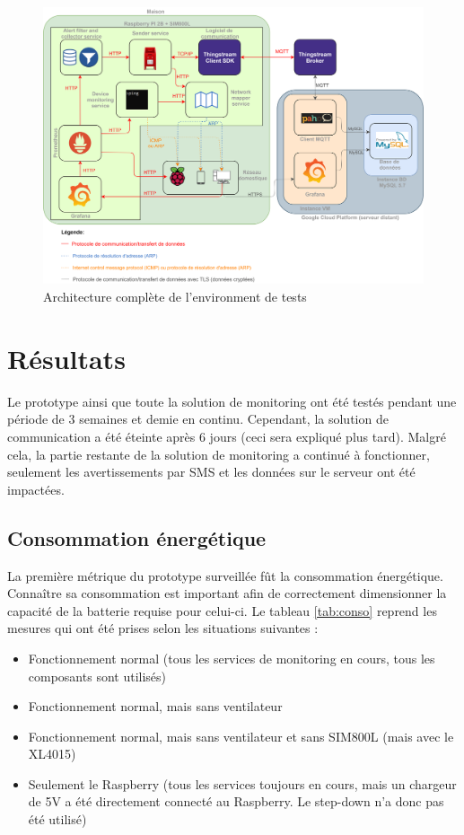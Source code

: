 \begin{figure} [ht!]
  \includegraphics[width=\textwidth]{img/tests/test_env.png}
  \caption{Architecture complète de l'environment de tests}
  \label{fig:test_deploy}
\end{figure}


\section{Résultats}

\noindent
Le prototype ainsi que toute la solution de monitoring ont été testés pendant une période de 3 semaines et demie en continu. Cependant, la solution de communication a été éteinte après 6 jours (ceci sera expliqué plus tard). Malgré cela, la partie restante de la solution de monitoring a continué à fonctionner, seulement les avertissements par SMS et les données sur le serveur ont été impactées.

\subsection{Consommation énergétique}

\noindent
La première métrique du prototype surveillée fût la consommation énergétique. Connaître sa consommation est important afin de correctement dimensionner la capacité de la batterie requise pour celui-ci. Le tableau \ref{tab:conso} reprend les mesures qui ont été prises selon les situations suivantes :
\vspace{0.1cm}
\begin{itemize}
  \item Fonctionnement normal (tous les services de monitoring en cours, tous les composants sont utilisés)
  \item Fonctionnement normal, mais sans ventilateur
  \item Fonctionnement normal, mais sans ventilateur et sans SIM800L (mais avec le XL4015)
  \item Seulement le Raspberry (tous les services toujours en cours, mais un chargeur de 5V a été directement connecté au Raspberry. Le step-down n'a donc pas été utilisé)
\end{itemize}


